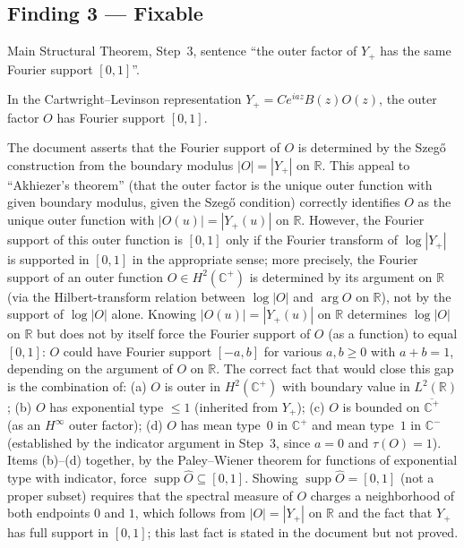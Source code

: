 \documentclass[11pt]{article}
\newcommand{\R}{\mathbb{R}}
\newcommand{\C}{\mathbb{C}}
\begin{document}
\subsection*{Finding 3 — Fixable}

\begin{description}[leftmargin=0pt]
\item[Location:]
Main Structural Theorem, Step~3, sentence
``the outer factor of $Y_+$ has the same Fourier support $[0,1]$''.

\item[Claim as written:]
In the Cartwright--Levinson representation $Y_+=Ce^{iaz}B(z)O(z)$, the outer
factor $O$ has Fourier support $[0,1]$.

\item[What is relied on but not established in the text:]
The document asserts that the Fourier support of $O$ is determined by the Szeg\H{o}
construction from the boundary modulus $|O|=|Y_+|$ on $\R$.
This appeal to ``Akhiezer's theorem'' (that the outer factor is the unique outer
function with given boundary modulus, given the Szeg\H{o} condition) correctly
identifies $O$ as the unique outer function with $|O(u)|=|Y_+(u)|$ on $\R$.
However, the Fourier support of this outer function is $[0,1]$ only if the
Fourier transform of $\log|Y_+|$ is supported in $[0,1]$ in the appropriate
sense; more precisely, the Fourier support of an outer function $O\in H^2(\C^+)$
is determined by its argument on $\R$ (via the Hilbert-transform relation between
$\log|O|$ and $\arg O$ on $\R$), not by the support of $\log|O|$ alone.
Knowing $|O(u)|=|Y_+(u)|$ on $\R$ determines $\log|O|$ on $\R$ but does not by
itself force the Fourier support of $O$ (as a function) to equal $[0,1]$: $O$
could have Fourier support $[-a,b]$ for various $a,b\ge 0$ with $a+b=1$, depending
on the argument of $O$ on $\R$.
The correct fact that would close this gap is the combination of:
(a) $O$ is outer in $H^2(\C^+)$ with boundary value in $L^2(\R)$;
(b) $O$ has exponential type $\le 1$ (inherited from $Y_+$);
(c) $O$ is bounded on $\overline{\C^+}$ (as an $H^\infty$ outer factor);
(d) $O$ has mean type~$0$ in $\C^+$ and mean type~$1$ in $\C^-$
(established by the indicator argument in Step~3, since $a=0$ and $\tau(O)=1$).
Items (b)--(d) together, by the Paley--Wiener theorem for functions of exponential
type with indicator, force $\operatorname{supp}\hat O\subseteq[0,1]$.
Showing $\operatorname{supp}\hat O=[0,1]$ (not a proper subset) requires that
the spectral measure of $O$ charges a neighborhood of both endpoints $0$ and $1$,
which follows from $|O|=|Y_+|$ on $\R$ and the fact that $Y_+$ has full support
in $[0,1]$; this last fact is stated in the document but not proved.


\end{description}
\end{document}

